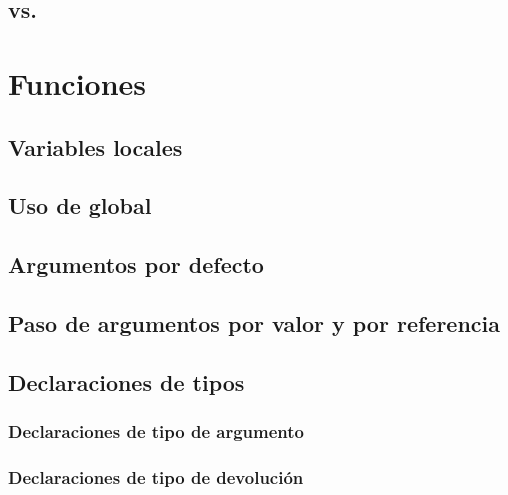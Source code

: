 \documentclass[a4paper,11pt,spanish]{sphinxmanual}
\begin{document}
\section{ vs. }
\label{\detokenize{conceptos-basicos-de-php:isset-vs-array-key-exists}}

\chapter{Funciones}
\label{\detokenize{conceptos-basicos-de-php:funciones}}

\section{Variables locales}
\label{\detokenize{conceptos-basicos-de-php:variables-locales}}

\section{Uso de global}
\label{\detokenize{conceptos-basicos-de-php:uso-de-global}}

\section{Argumentos por defecto}
\label{\detokenize{conceptos-basicos-de-php:argumentos-por-defecto}}

\section{Paso de argumentos por valor y por referencia}
\label{\detokenize{conceptos-basicos-de-php:paso-de-argumentos-por-valor-y-por-referencia}}

\section{Declaraciones de tipos}
\label{\detokenize{conceptos-basicos-de-php:declaraciones-de-tipos}}

\subsection{Declaraciones de tipo de argumento}
\label{\detokenize{conceptos-basicos-de-php:declaraciones-de-tipo-de-argumento}}

\subsection{Declaraciones de tipo de devolución}
\label{\detokenize{conceptos-basicos-de-php:declaraciones-de-tipo-de-devolucion}}
\end{document}
